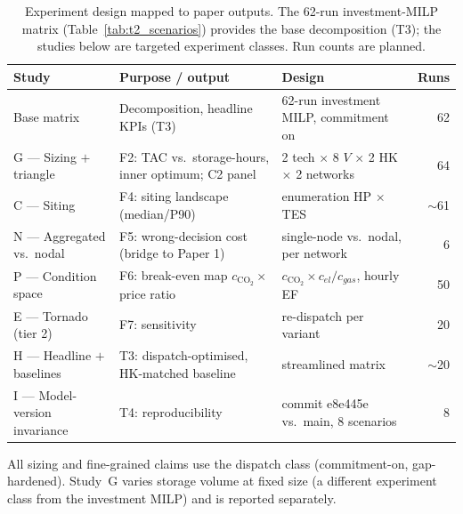 \begin{table}[htbp]
  \centering
  \caption{Experiment design mapped to paper outputs. The 62-run investment-MILP
  matrix (Table~\ref{tab:t2_scenarios}) provides the base decomposition (T3); the
  studies below are targeted experiment classes. Run counts are planned.}
  \label{tab:t2e_study_map}
  \small
  \begin{tabular}{@{}lllr@{}}
  \toprule
  Study & Purpose / output & Design & Runs \\
  \midrule
  Base matrix & Decomposition, headline KPIs (T3) & 62-run investment MILP, commitment on & 62 \\
  G — Sizing $+$ triangle & F2: TAC vs.\ storage-hours, inner optimum; C2 panel & 2 tech $\times$ 8 $V$ $\times$ 2 HK $\times$ 2 networks & 64 \\
  C — Siting & F4: siting landscape (median/P90) & enumeration HP $\times$ TES & $\sim$61 \\
  N — Aggregated vs.\ nodal & F5: wrong-decision cost (bridge to Paper 1) & single-node vs.\ nodal, per network & 6 \\
  P — Condition space & F6: break-even map $c_{\mathrm{CO_2}}\times$ price ratio & $c_{\mathrm{CO_2}} \times c_{el}/c_{gas}$, hourly EF & 50 \\
  E — Tornado (tier 2) & F7: sensitivity & re-dispatch per variant & 20 \\
  H — Headline $+$ baselines & T3: dispatch-optimised, HK-matched baseline & streamlined matrix & $\sim$20 \\
  I — Model-version invariance & T4: reproducibility & commit e8e445e vs.\ main, 8 scenarios & 8 \\
  \bottomrule
  \end{tabular}

  \vspace{2pt}
  {\footnotesize All sizing and fine-grained claims use the dispatch class
  (commitment-on, gap-hardened). Study~G varies storage volume at fixed size (a
  different experiment class from the investment MILP) and is reported separately.}
\end{table}
